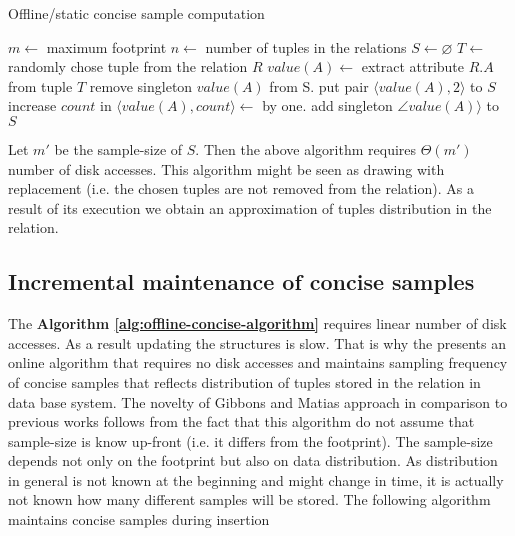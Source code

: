 \begin{algorithm}
  \caption{Offline/static concise sample computation}
  \label{alg:offline-concise-algorithm}
\begin{algorithmic}
  \State $m \gets$ maximum footprint
  \State $n \gets$ number of tuples in the relations
  \State $S \gets  \varnothing$
    \State $T \gets$ randomly chose tuple from the relation $R$
    \State $value(A) \gets$ extract attribute $R.A$ from tuple $T$
        \State remove singleton $value(A)$ from S.
        \State put pair $\langle value(A), 2 \rangle$ to $S$
        \State increase $count$ in $\langle value(A), count
        \rangle \gets$ by one.
    \Else
        \State add singleton $\angle value(A) \rangle$ to $S$
    \EndIf
    \EndWhile
  \end{algorithmic}
\end{algorithm}

Let $m'$ be the sample-size of $S$. Then the above algorithm requires
$\Theta(m')$ number of disk accesses. This algorithm might be seen
as drawing with replacement (i.e. the chosen tuples are
not removed from the relation). As a result of its execution we obtain
an approximation of tuples distribution in the relation.

\subsection{Incremental maintenance of concise samples}
The \textbf{Algorithm \ref{alg:offline-concise-algorithm}} requires
linear number of disk
accesses. As a result updating the structures is slow. That is why
the \cite{GM98} presents an online algorithm that requires no disk
accesses and maintains sampling frequency of concise samples that
reflects distribution of tuples stored in the relation in data base system.
The novelty of Gibbons and Matias approach in comparison to previous
works follows from the fact that this algorithm do not assume that
sample-size is know up-front (i.e. it differs from the footprint).
The sample-size depends not only on the footprint but also on data
distribution. As distribution in general is not known at the beginning
and might change in time, it is actually not known how many different
samples will be stored. The following algorithm maintains concise
samples during insertion

